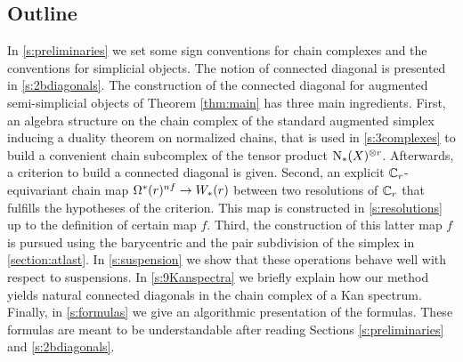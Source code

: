 \subsection{Outline}

In \cref{s:preliminaries} we set some sign conventions for chain complexes and the conventions for simplicial objects.
The notion of connected diagonal is presented in \cref{s:2bdiagonals}.
The construction of the connected diagonal for augmented semi-simplicial objects of Theorem \ref{thm:main} has three main ingredients.
First, an algebra structure on the chain complex of the standard augmented simplex inducing a duality theorem on normalized chains, that is used in \cref{s:3complexes} to build a convenient chain subcomplex of the tensor product $\operatorname{N}_{*}(X)^{\otimes r}$.
Afterwards, a criterion to build a connected diagonal is given.
Second, an explicit $\mathbb{C}_r$-equivariant chain map $\Omega^*(r)^{nf} \to W_*(r)$ between two resolutions of $\mathbb{C}_r$ that fulfills the hypotheses of the criterion.
This map is constructed in \cref{s:resolutions} up to the definition of certain map $f$.
Third, the construction of this latter map $f$ is pursued using the barycentric and the pair subdivision of the simplex in \cref{section:atlast}.
In \cref{s:suspension} we show that these operations behave well with respect to suspensions.
In \cref{s:9Kanspectra} we briefly explain how our method yields natural connected diagonals in the chain complex of a Kan spectrum.
Finally, in \cref{s:formulas} we give an algorithmic presentation of the formulas.
These formulas are meant to be understandable after reading Sections \ref{s:preliminaries} and \ref{s:2bdiagonals}.